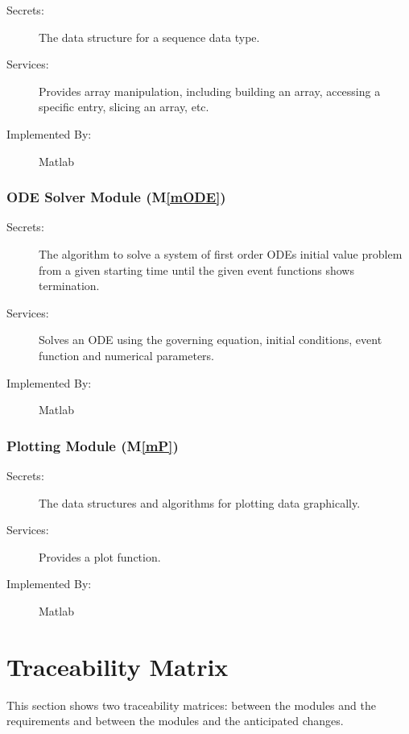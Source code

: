 \documentclass[12pt, titlepage]{article}
\newcommand{\mref}[1]{M\ref{#1}}
\begin{document}
\begin{description}
\item[Secrets:]The data structure for a sequence data type. 
\item[Services:]Provides array manipulation, including building an array,
  accessing a specific entry, slicing an array, etc.
\item[Implemented By:] Matlab
\end{description} 

\subsubsection{ODE Solver Module (\mref{mODE})}

\begin{description}
\item[Secrets:]The algorithm to solve a system of first order ODEs initial value
  problem from a given starting time until the given event functions shows
  termination.
\item[Services:]Solves an ODE using the governing equation, initial conditions,
  event function and numerical parameters.
\item[Implemented By:] Matlab
\end{description} 

\subsubsection{Plotting Module (\mref{mP})}

\begin{description}
\item[Secrets:]The data structures and algorithms for plotting data graphically. 
\item[Services:]Provides a plot function. 
\item[Implemented By:] Matlab
\end{description} 


\section{Traceability Matrix} \label{SecTM}

This section shows two traceability matrices: between the modules and the
requirements and between the modules and the anticipated changes.
\end{document}
